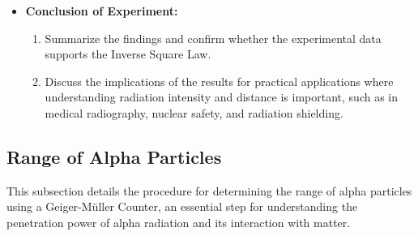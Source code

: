 \documentclass[11pt]{article}
\begin{document}
\begin{itemize}
		\item \textbf{Conclusion of Experiment:}
		\begin{enumerate}
			\item Summarize the findings and confirm whether the experimental data supports the Inverse Square Law.
			\item Discuss the implications of the results for practical applications where understanding radiation intensity and distance is important, such as in medical radiography, nuclear safety, and radiation shielding.
		\end{enumerate}
	\end{itemize}
	
	\subsection{Range of Alpha Particles}
	
	This subsection details the procedure for determining the range of alpha particles using a Geiger-Müller Counter, an essential step for understanding the penetration power of alpha radiation and its interaction with matter.
	
\end{document}
